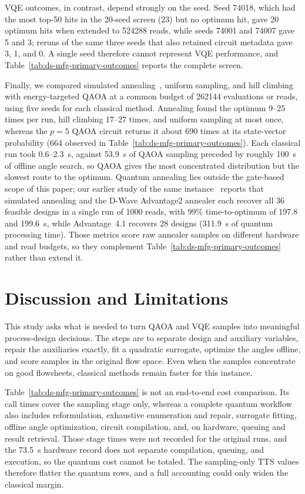 \documentclass[10pt,letterpaper]{article}
\begin{document}
VQE outcomes, in contrast, depend strongly on the seed.
Seed 74018, which had the most top-50 hits in the 20-seed screen (23) but no optimum hit, gave 20 optimum hits when extended to 524288 reads, while seeds 74001 and 74007 gave 5 and 3; reruns of the same three seeds that also retained circuit metadata gave 3, 1, and 0.
A single seed therefore cannot represent VQE performance, and Table~\ref{tab:ds-mfg-primary-outcomes} reports the complete screen.

Finally, we compared simulated annealing~\cite{Kirkpatrick1983}, uniform sampling, and hill climbing with energy-targeted QAOA at a common budget of 262144 evaluations or reads, using five seeds for each classical method.
Annealing found the optimum 9--25 times per run, hill climbing 17--27 times, and uniform sampling at most once, whereas the $p=5$ QAOA circuit returns it about 690 times at its state-vector probability (664 observed in Table~\ref{tab:ds-mfg-primary-outcomes}).
Each classical run took 0.6--2.3~s, against 53.9~s of QAOA sampling preceded by roughly 100~s of offline angle search, so QAOA gives the most concentrated distribution but the slowest route to the optimum.
Quantum annealing lies outside the gate-based scope of this paper; our earlier study of the same instance~\cite{park2026arxiv} reports that simulated annealing and the D-Wave Advantage2 annealer each recover all 36 feasible designs in a single run of 1000 reads, with 99\% time-to-optimum of 197.8 and 199.6~s, while Advantage~4.1 recovers 28 designs (311.9~s of quantum processing time).
Those metrics score raw annealer samples on different hardware and read budgets, so they complement Table~\ref{tab:ds-mfg-primary-outcomes} rather than extend it.

\section{Discussion and Limitations}
\label{sec:ds-mfg-discussion}

This study asks what is needed to turn QAOA and VQE samples into meaningful process-design decisions.
The steps are to separate design and auxiliary variables, repair the auxiliaries exactly, fit a quadratic surrogate, optimize the angles offline, and score samples in the original flow space.
Even when the samples concentrate on good flowsheets, classical methods remain faster for this instance.

Table~\ref{tab:ds-mfg-primary-outcomes} is not an end-to-end cost comparison.
Its call times cover the sampling stage only, whereas a complete quantum workflow also includes reformulation, exhaustive enumeration and repair, surrogate fitting, offline angle optimization, circuit compilation, and, on hardware, queuing and result retrieval.
Those stage times were not recorded for the original runs, and the 73.5~s hardware record does not separate compilation, queuing, and execution, so the quantum cost cannot be totaled.
The sampling-only TTS values therefore flatter the quantum rows, and a full accounting could only widen the classical margin.
\end{document}

